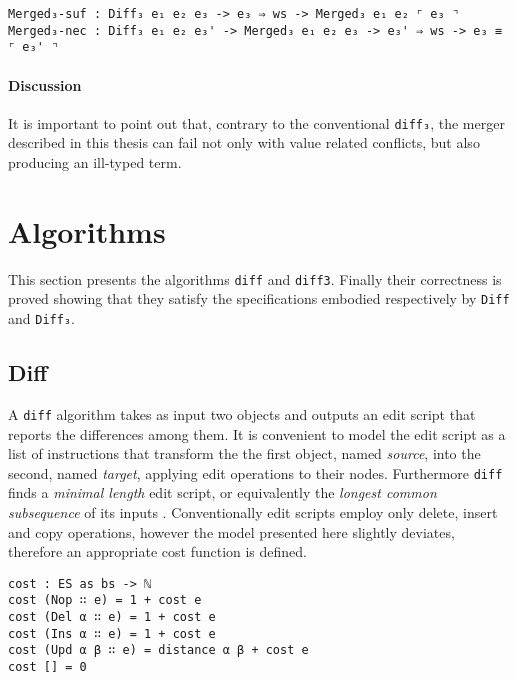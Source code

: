 \documentclass[../Thesis.tex]{subfiles}
\begin{document}
\begin{verbatim}
Merged₃-suf : Diff₃ e₁ e₂ e₃ -> e₃ ⇒ ws -> Merged₃ e₁ e₂ ⌜ e₃ ⌝
Merged₃-nec : Diff₃ e₁ e₂ e₃' -> Merged₃ e₁ e₂ e₃ -> e₃' ⇒ ws -> e₃ ≡ ⌜ e₃' ⌝
\end{verbatim}
	
	\paragraph{Discussion}
	It is important to point out that, contrary to the conventional
	\texttt{diff₃}, the merger described in this thesis can fail 
	not only with value related conflicts, but also producing
	an ill-typed term.
	
\section{Algorithms}
This section presents the algorithms \texttt{diff} and \texttt{diff3}.
Finally their correctness is proved showing that they satisfy the specifications
embodied respectively by \texttt{Diff} and \texttt{Diff₃}.

	\subsection{Diff}
	\label{subsec:AlgoDiff}
	A \texttt{diff} algorithm takes as input two objects 
	and outputs an edit script that reports the differences among them.
	It is convenient to model the edit script as a list of instructions that
	transform the the first object, named \emph{source}, into the second,
	named \emph{target}, applying edit operations to their nodes.
	Furthermore \texttt{diff} finds a \emph{minimal length} edit script, or
	equivalently the \emph{longest common subsequence} of its inputs
	\cite{Berg00, PierceDiff3}. 
	Conventionally edit scripts employ only delete, insert and copy operations,
	however the model presented here slightly deviates, therefore an 
	appropriate cost function is defined.
	
	
\begin{verbatim}
cost : ES as bs -> ℕ
cost (Nop ∷ e) = 1 + cost e
cost (Del α ∷ e) = 1 + cost e
cost (Ins α ∷ e) = 1 + cost e
cost (Upd α β ∷ e) = distance α β + cost e 
cost [] = 0
\end{verbatim}
\end{document}
